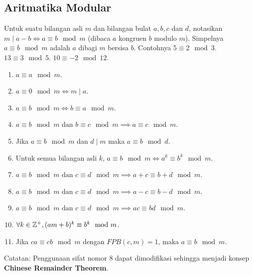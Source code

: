 \subsection{Aritmatika Modular}
    Untuk suatu bilangan asli $m$ dan bilangan bulat $a,b,c$ dan $d$, notasikan $m\mid a-b \iff a \equiv b \mod m$ (dibaca $a$ kongruen $b$ modulo $m$). Simpelnya $a \equiv b \mod m$ adalah $a$ dibagi $m$ bersisa $b$. Contohnya $5 \equiv 2 \mod 3$. $13 \equiv 3 \mod 5$. $10 \equiv -2 \mod 12$.
    \begin{enumerate}
        \item $a \equiv a \mod m$.
        \item $a \equiv 0 \mod m \iff m\mid a$.
        \item $a \equiv b \mod m \iff b \equiv a \mod m$.
        \item $a \equiv b \mod m \text{ dan } b \equiv c \mod m \implies a \equiv c \mod m$.
        \item Jika $a \equiv b \mod m$ dan $d\mid m$ maka $a \equiv b \mod d$.
        \item Untuk semua bilangan asli $k$, $a \equiv b \mod m \iff a^k \equiv b^k \mod m$.
        \item $a \equiv b \mod m \text{ dan } c \equiv d \mod m \implies a+c \equiv b+d \mod m$.
        \item $a \equiv b \mod m \text{ dan } c \equiv d \mod m \implies a-c \equiv b-d \mod m$.
        \item $a \equiv b \mod m \text{ dan } c \equiv d \mod m \implies ac \equiv bd \mod m$.
        \item $\forall k\in \mathbb Z^+, (am+b)^k \equiv b^k \mod m$.
        \item Jika $ca \equiv cb \mod m$ dengan $FPB(c,m)=1$, maka $a \equiv b \mod m$.
    \end{enumerate}
    
    Catatan: Penggunaan sifat nomor 8 dapat dimodifikasi sehingga menjadi konsep \textbf{Chinese Remainder Theorem}.